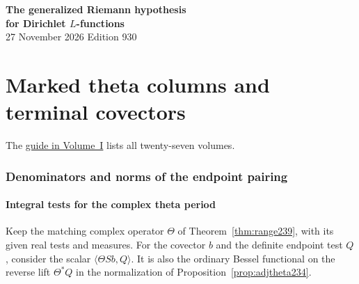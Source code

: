 \documentclass[a4paper,11pt]{article}
\theoremstyle{definition}
\theoremstyle{remark}
\numberwithin{equation}{section}
\begin{document}
\setcounter{part}{23}
\thispagestyle{plain}\begin{center}
{\LARGE\bfseries The generalized Riemann hypothesis\\[2pt]for Dirichlet \(L\)-functions}\\[6pt]
{\small 27 November 2026 \quad\textperiodcentered\quad Edition 930}\end{center}
\part{Marked theta columns and terminal covectors}\label{part:XXIV}
\begin{abstract}\noindent We express the endpoint pairing in terms of signed tests on marked classes. Summing over the intermediate residue classes gives formulas for the composite terminal covectors, their Gram matrices and their integral moments.\end{abstract}
\setcounter{section}{124}
\noindent The \hyperref[seriesguide]{guide in Volume~I} lists all twenty-seven volumes.
\begingroup\small\setlength{\parskip}{0pt}\tableofcontents\endgroup
\clearpage

\section{Denominators and norms of the endpoint pairing}\label{nav:g-XII-3}\label{nav:volume-XXIV}

\subsection{Integral tests for the complex theta period}\label{nav:IX-61}
Keep the matching complex operator \(\Theta\) of
Theorem~\ref{thm:range239}, with its given real tests
and measures. For the covector \(b\) and the definite
endpoint test \(Q\), consider the scalar
\(\langle\Theta S b,Q\rangle\). It is also the ordinary
Bessel functional on the reverse lift \(\Theta^*Q\)
in the normalization of Proposition~\ref{prop:adjtheta234}.
\end{document}
